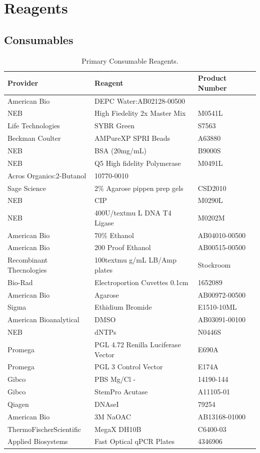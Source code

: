 \documentclass[a4paper]{article}
\begin{document}
\section{Reagents}
    \subsection{Consumables}
    	\FloatBarrier
            \begin{table}[H]
				\centering
				\begin{tabular}{l|l|l}
Provider	&	Reagent	&	Product Number	\\\hline
American Bio	&	DEPC Water:AB02128-00500	\\
NEB	&	High Fiedelity 2x Master Mix	&	M0541L	\\
Life Technologies	&	SYBR Green	&	S7563	\\
Beckman Coulter	&	AMPureXP SPRI Beads	&	A63880	\\
NEB	&	BSA (20mg/mL)	&	B9000S	\\
NEB	&	Q5 High fidelity Polymerase	&	M0491L	\\
Acros Organics:2-Butanol	&	10770-0010	\\
Sage Science	&	2\% Agarose pippen prep gels	&	CSD2010	\\
NEB	&	CIP	&	M0290L	\\
NEB	&	400U/textmu L DNA T4 Ligase	&	M0202M	\\
American Bio	&	70\% Ethanol	&	AB04010-00500	\\
American Bio	&	200 Proof Ethanol	&	AB00515-00500	\\
Recombinant Thecnologies	&	100textmu g/mL LB/Amp plates	&	Stockroom	\\
Bio-Rad	&	Electroportion Cuvettes 0.1cm	&	1652089	\\
American Bio	&	Agarose	&	AB00972-00500	\\
Sigma	&	Ethidium Bromide	&	E1510-10ML	\\
American Bioanalytical	&	DMSO	&	AB03091-00100	\\
NEB	&	dNTPs	&	N0446S	\\
Promega	&	PGL 4.72 Renilla Luciferase Vector	&	E690A	\\
Promega	&	PGL 3 Control Vector	&	E174A	\\
Gibco	&	PBS Mg/Cl -	&	14190-144	\\
Gibco	&	StemPro Acutase	&	A11105-01	\\
Qiagen	&	DNAseI	&	79254	\\
American Bio	&	3M NaOAC	&	AB13168-01000	\\
ThermoFischerScientific	&	MegaX DH10B	&	C6400-03	\\
Applied Biosystems	&	Fast Optical qPCR Plates	&	4346906	\\
            \end{tabular}
           		\caption{\label{CReagents}Primary Consumable Reagents.}
           \end{table}
        
\end{document}
